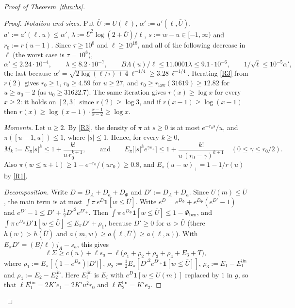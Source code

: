 \begin{proof}[Proof of Theorem~\ref{thm:bs}]
\begin{proof}
\emph{Notation and sizes.} Put $\bar U:=U(\ell)$, $\alpha':=a'(\ell,\bar U)$, $a':=a'(\ell,u)\le\alpha'$,
$\lambda:=\bar U^2\log(2+\bar U)/\ell$, $s:=w-u\in[-1,\infty)$ and $r_0:=r(u-1)$. Since $\tau\ge10^8$ and $\ell\ge10^{18}$, and all
of the following decrease in $\ell$ (the worst case is $\tau=10^8$),
\[
  \alpha'\le2.24\cdot10^{-4},\qquad\lambda\le8.2\cdot10^{-7},\qquad B\Lambda(u)/\ell\le11.0001\lambda\le9.1\cdot10^{-6},\qquad
  1/\sqrt\ell\le10^{-5}\alpha' ,
\]
the last because $\alpha'=\sqrt{2\log(\ell/\tau)+4}\,\ell^{-1/4}\ge3.28\,\ell^{-1/4}$. Iterating \ref{R3} from $r(2)$ gives
$r_0\ge1$, $r_0\ge4.59$ for $u\ge27$, and $r_0\ge r_{\mathrm{low}}(31619)\ge12.82$ for $u\ge u_0-2$ (as $u_0\ge31622.7$). The same
iteration gives $r(x)\ge\log x$ for every $x\ge2$: it holds on $[2,3]$ since $r(2)\ge\log3$, and if $r(x-1)\ge\log(x-1)$ then
$r(x)\ge\log(x-1)\cdot\frac{x-1}{x-2}\ge\log x$.

\emph{Moments.} Let $u\ge2$. By \ref{R3}, the density of $\pi$ at $s\ge0$ is at most $e^{-r_0s}/u$, and $\pi([u-1,u])\le1$,
where $|s|\le1$. Hence, for every $k\ge0$,
\[
  M_k:=E_\pi|s|^k\le1+\frac{k!}{u\,r_0^{k+1}},\qquad\text{and}\qquad
  E_\pi\big[|s|^ke^{\gamma s_+}\big]\le1+\frac{k!}{u\,(r_0-\gamma)^{k+1}}\quad(0\le\gamma\le r_0/2).
\]
Also $\pi(w\le u+1)\ge1-e^{-r_0}/(ur_0)\ge0.8$, and $E_\pi(u-w)_+=1-1/r(u)$ by \ref{R1}.

\emph{Decomposition.} Write $D=D_A+D_a+D_\Phi$ and $D':=D_A+D_a$. Since $U(m)\le\bar U$, the main term is at most
$\int\pi\,e^D\mathbf 1[w\le\bar U]$. Write $e^D=e^{D_\Phi}+e^{D_\Phi}(e^{D'}-1)$ and $e^{D'}-1\le D'+\frac12D'^2e^{D'_+}$. Then
$\int\pi\,e^{D_\Phi}\mathbf 1[w\le\bar U]\le1-\Phi_{\mathrm{ben}}$, and
$\int\pi\,e^{D_\Phi}D'\mathbf 1[w\le\bar U]\le E_\pi D'+\rho_1$, because $D'\ge0$ for $w>\bar U$ (there $h(w)>h(\bar U)$ and
$a(m,w)\ge a(\ell,\bar U)\ge a(\ell,u)$). With $E_\pi D'=(B/\ell)j_A-s_a$, this gives
\[
  \ell\Sigma\ge c(u)+\ell s_a-\ell\big(\rho_1+\rho_2+\rho_3+\rho_4+E_3+T\big),
\]
where $\rho_1:=E_\pi[(1-e^{D_\Phi})|D'|]$, $\rho_2:=\frac12E_\pi[D'^2e^{D'_+}\mathbf 1[w\le\bar U]]$, $\rho_3:=E_1-E_1^{\mathrm{lin}}$ and
$\rho_4:=E_2-E_2^{\mathrm{lin}}$. Here $E_i^{\mathrm{lin}}$ is $E_i$ with $e^D\mathbf 1[w\le U(m)]$ replaced by $1$ in $g$, so that
$\ell E_1^{\mathrm{lin}}=2K'e_1=2K'u^2r_0$ and $\ell E_2^{\mathrm{lin}}=K'e_2$.


\end{proof}
\end{proof}
